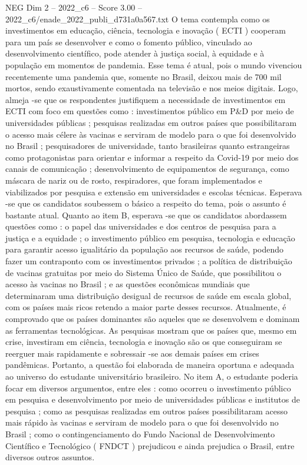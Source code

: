 \begin{textsample}{NEG Dim 2 – 2022\_c6 – Score 3.00 – 2022\_c6/enade\_2022\_publi\_d731a0a567.txt}
O tema contempla como os investimentos em educação, ciência, tecnologia e inovação ( ECTI ) cooperam para um país se desenvolver e como o fomento público, vinculado ao desenvolvimento científico, pode atender à justiça social, à equidade e à população em momentos de pandemia.
Esse tema é atual, pois o mundo vivenciou recentemente uma pandemia que, somente no Brasil, deixou mais de 700 mil mortos, sendo exaustivamente comentada na televisão e nos meios digitais.
Logo, almeja -se que os respondentes justifiquem a necessidade de investimentos em ECTI com foco em questões como : investimentos público em P\&D por meio de universidades públicas ; pesquisas realizadas em outros países que possibilitaram o acesso mais célere às vacinas e serviram de modelo para o que foi desenvolvido no Brasil ; pesquisadores de universidade, tanto brasileiras quanto estrangeiras como protagonistas para orientar e informar a respeito da Covid-19 por meio dos canais de comunicação ; desenvolvimento de equipamentos de segurança, como máscara de nariz ou de rosto, respiradores, que foram implementados e viabilizados por pesquisa e extensão em universidades e escolas técnicas.
Esperava -se que os candidatos soubessem o básico a respeito do tema, pois o assunto é bastante atual.
Quanto ao item B, esperava -se que os candidatos abordassem questões como : o papel das universidades e dos centros de pesquisa para a justiça e a equidade ; o investimento público em pesquisa, tecnologia e educação para garantir acesso igualitário da população aos recursos de saúde, podendo fazer um contraponto com os investimentos privados ; a política de distribuição de vacinas gratuitas por meio do Sistema Único de Saúde, que possibilitou o acesso às vacinas no Brasil ; e as questões econômicas mundiais que determinaram uma distribuição desigual de recursos de saúde em escala global, com os países mais ricos retendo a maior parte desses recursos.
Atualmente, é comprovado que os países dominantes são aqueles que se desenvolvem e dominam as ferramentas tecnológicas.
As pesquisas mostram que os países que, mesmo em crise, investiram em ciência, tecnologia e inovação são os que conseguiram se reerguer mais rapidamente e sobressair -se aos demais países em crises pandêmicas.
Portanto, a questão foi elaborada de maneira oportuna e adequada ao universo do estudante universitário brasileiro.
No item A, o estudante poderia focar em diversos argumentos, entre eles : como ocorreu o investimento público em pesquisa e desenvolvimento por meio de universidades públicas e institutos de pesquisa ; como as pesquisas realizadas em outros países possibilitaram acesso mais rápido às vacinas e serviram de modelo para o que foi desenvolvido no Brasil ; como o contingenciamento do Fundo Nacional de Desenvolvimento Científico e Tecnológico ( FNDCT ) prejudicou e ainda prejudica o Brasil, entre diversos outros assuntos.

\end{textsample}
